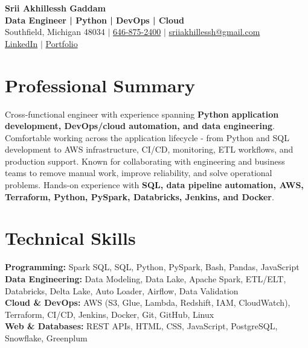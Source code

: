 \documentclass[letterpaper,10pt]{article}
\begin{document}
\fontsize{9.35pt}{10.45pt}\selectfont

\begin{center}
    {\LARGE \textbf{Srii Akhillessh Gaddam}} \\[-1pt]
    \textbf{Data Engineer | Python | DevOps | Cloud} \\[2pt]
    Southfield, Michigan 48034 $|$
    \href{tel:6468752400}{646-875-2400} $|$
    \href{mailto:sriiakhillessh@gmail.com}{sriiakhillessh@gmail.com} \\[1pt]
    \href{https://www.linkedin.com/in/srii-akhiilessh-gaddam-b48668191/}{LinkedIn} $|$
    \href{https://sriiakhillesshg.github.io/portfolio/}{Portfolio}
\end{center}
\vspace{-8pt}

\section{Professional Summary}
\small{Cross-functional engineer with experience spanning \textbf{Python application development, DevOps/cloud automation, and data engineering}. Comfortable working across the application lifecycle - from Python and SQL development to AWS infrastructure, CI/CD, monitoring, ETL workflows, and production support. Known for collaborating with engineering and business teams to remove manual work, improve reliability, and solve operational problems. Hands-on experience with \textbf{SQL, data pipeline automation, AWS, Terraform, Python, PySpark, Databricks, Jenkins, and Docker}.}

\section{Technical Skills}
\small{
\textbf{Programming:} Spark SQL, SQL, Python, PySpark, Bash, Pandas, JavaScript \\
\textbf{Data Engineering:} Data Modeling, Data Lake, Apache Spark, ETL/ELT, Databricks, Delta Lake, Auto Loader, Airflow, Data Validation \\
\textbf{Cloud \& DevOps:} AWS (S3, Glue, Lambda, Redshift, IAM, CloudWatch), Terraform, CI/CD, Jenkins, Docker, Git, GitHub, Linux \\
\textbf{Web \& Databases:} REST APIs, HTML, CSS, JavaScript, PostgreSQL, Snowflake, Greenplum
}
\end{document}
